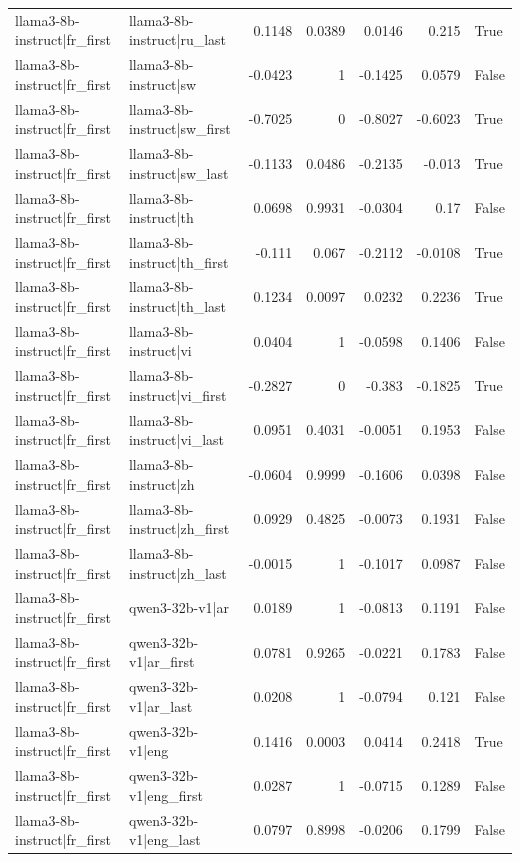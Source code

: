 \begin{table}
\begin{tabular}{l l r r r r l}
llama3-8b-instruct|fr_first & llama3-8b-instruct|ru_last & 0.1148 & 0.0389 & 0.0146 & 0.215 & True \\
llama3-8b-instruct|fr_first & llama3-8b-instruct|sw & -0.0423 & 1 & -0.1425 & 0.0579 & False \\
llama3-8b-instruct|fr_first & llama3-8b-instruct|sw_first & -0.7025 & 0 & -0.8027 & -0.6023 & True \\
llama3-8b-instruct|fr_first & llama3-8b-instruct|sw_last & -0.1133 & 0.0486 & -0.2135 & -0.013 & True \\
llama3-8b-instruct|fr_first & llama3-8b-instruct|th & 0.0698 & 0.9931 & -0.0304 & 0.17 & False \\
llama3-8b-instruct|fr_first & llama3-8b-instruct|th_first & -0.111 & 0.067 & -0.2112 & -0.0108 & True \\
llama3-8b-instruct|fr_first & llama3-8b-instruct|th_last & 0.1234 & 0.0097 & 0.0232 & 0.2236 & True \\
llama3-8b-instruct|fr_first & llama3-8b-instruct|vi & 0.0404 & 1 & -0.0598 & 0.1406 & False \\
llama3-8b-instruct|fr_first & llama3-8b-instruct|vi_first & -0.2827 & 0 & -0.383 & -0.1825 & True \\
llama3-8b-instruct|fr_first & llama3-8b-instruct|vi_last & 0.0951 & 0.4031 & -0.0051 & 0.1953 & False \\
llama3-8b-instruct|fr_first & llama3-8b-instruct|zh & -0.0604 & 0.9999 & -0.1606 & 0.0398 & False \\
llama3-8b-instruct|fr_first & llama3-8b-instruct|zh_first & 0.0929 & 0.4825 & -0.0073 & 0.1931 & False \\
llama3-8b-instruct|fr_first & llama3-8b-instruct|zh_last & -0.0015 & 1 & -0.1017 & 0.0987 & False \\
llama3-8b-instruct|fr_first & qwen3-32b-v1|ar & 0.0189 & 1 & -0.0813 & 0.1191 & False \\
llama3-8b-instruct|fr_first & qwen3-32b-v1|ar_first & 0.0781 & 0.9265 & -0.0221 & 0.1783 & False \\
llama3-8b-instruct|fr_first & qwen3-32b-v1|ar_last & 0.0208 & 1 & -0.0794 & 0.121 & False \\
llama3-8b-instruct|fr_first & qwen3-32b-v1|eng & 0.1416 & 0.0003 & 0.0414 & 0.2418 & True \\
llama3-8b-instruct|fr_first & qwen3-32b-v1|eng_first & 0.0287 & 1 & -0.0715 & 0.1289 & False \\
llama3-8b-instruct|fr_first & qwen3-32b-v1|eng_last & 0.0797 & 0.8998 & -0.0206 & 0.1799 & False \\

\end{tabular}
\end{table}
